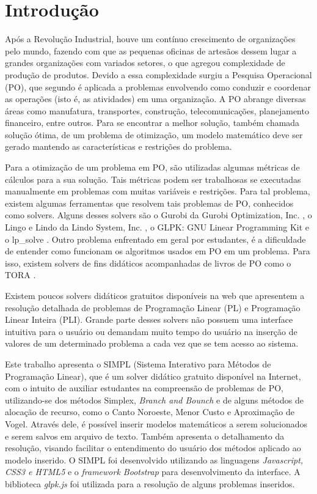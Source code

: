 \documentclass [11pt]{articleSBPO}
\newcommand{\sigla}[0] {SIMPL }
\newcommand{\nome}[0] {Sistema Interativo para Métodos de Programação Linear}
\begin{document}
\newpage

\section{Introdução}\label{sec:introducao}
Após a Revolução Industrial, houve um contínuo crescimento de organizações pelo mundo, fazendo com que as pequenas oficinas de artesãos dessem lugar a grandes organizações com variados setores, o que agregou complexidade de produção de produtos. Devido a essa complexidade surgiu a Pesquisa Operacional (PO), que segundo \cite{hillier} é aplicada a problemas envolvendo como conduzir e coordenar as operações (isto é, as atividades) em uma organização. A PO abrange diversas áreas como manufatura, transportes, construção, telecomunicações, planejamento financeiro, entre outros. Para se encontrar a melhor solução, também chamada solução ótima, de um problema de otimização, um modelo matemático deve ser gerado mantendo as características e restrições do problema.

Para a otimização de um problema em PO, são utilizadas algumas métricas de cálculos para a sua solução. Tais métricas podem ser trabalhosas se executadas manualmente em problemas com muitas variáveis e restrições. Para tal problema, existem algumas ferramentas que resolvem tais problemas de PO, conhecidos como solvers. Alguns desses solvers são o Gurobi da Gurobi Optimization, Inc. \cite{gurobi}, o Lingo e Lindo da Lindo System, Inc. \cite{lindo}, o GLPK: GNU Linear Programming Kit  \cite{glpk} e o lp\_solve \cite{lpsolve}. Outro problema enfrentado em geral por estudantes, é a dificuldade de entender como funcionam os algoritmos usados em PO em um problema. Para isso, existem solvers de fins didáticos acompanhadas de livros de PO como o TORA \cite{taha}. 

Existem poucos solvers didáticos gratuitos disponíveis na web que apresentem a resolução detalhada de problemas de Programação Linear (PL) e Programação Linear Inteira (PLI). Grande parte desses solvers não possuem uma interface intuitiva para o usuário ou demandam muito tempo do usuário na inserção de valores de um determinado problema a cada vez que se tem acesso ao sistema.

Este trabalho apresenta o \sigla (\nome), que é um solver didático gratuito disponível na Internet, com o intuito de auxiliar estudantes na compreensão de problemas de PO, utilizando-se dos métodos Simplex, \textit{Branch and Bounch} e de alguns métodos de alocação de recurso, como o Canto Noroeste, Menor Custo e Aproximação de Vogel. Através dele, é possível inserir modelos matemáticos a serem solucionados e serem salvos em arquivo de texto. Também apresenta o detalhamento da resolução, visando facilitar o entendimento do usuário dos métodos aplicado ao modelo inserido. O \sigla foi desenvolvido utilizando as linguagens \textit{Javascript, CSS3 e HTML5} e o \textit{framework Bootstrap} para desenvolvimento da interface. A biblioteca \textit{glpk.js} foi utilizada para a resolução de alguns problemas inseridos.
\end{document}
